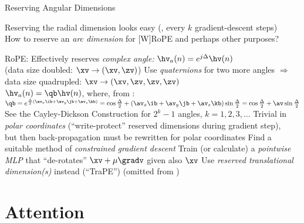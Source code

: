 \begin{slide}[\slideopts,toc={Reservations}]{Reserving Angular Dimensions}

  \vspace{-1em}

  Reserving the radial dimension looks easy (\eg,  every $k$ gradient-descent steps)\\
  How to reserve an \emph{arc dimension} for [W]RoPE and perhaps other purposes?

  \begin{itemize}
      \mpitem RoPE: Effectively reserves \emph{complex angle:} $\hv_a(n) = e^{j\Delta}\hv(n)$\\
      		    (data size doubled: $\xv \to (\xv,\zv)$)
      \mpitem Use \emph{quaternions} for two more angles $\Rightarrow$ data size quadrupled: $\xv \to (\xv,\zv,\zv,\zv)$\\
      $\hv_a(n) = \qb\hv(n)$, where, from :\\
      $
      \qb = e^{{\frac {\Delta}{2}}{(\av_x\ib +\av_y\jb +\av_z\kb )}}
      = \cos {\frac {\Delta }{2}}+(\av_x\ib +\av_y\jb + \av_z\kb )\sin {\frac {\Delta }{2}}
      = \cos {\frac {\Delta }{2}}+\av\sin {\frac {\Delta }{2}}
      $
      \mpitem See the Cayley-Dickson Construction for $2^k-1$ angles, $k=1,2,3,\ldots$
      \mpitem Trivial in \emph{polar coordinates} (``write-protect'' reserved dimensions during gradient step),\\
      but then back-propagation must be rewritten for polar coordinates
      \mpitem Find a suitable method of \emph{constrained gradient descent}
      \mpitem Train (or calculate) a \emph{pointwise MLP} that ``de-rotates'' $\xv+\mu\gradv$ given also $\xv$
      \mpitem Use \emph{reserved translational dimension(s)} instead (``TraPE'') (omitted from )
  \end{itemize}

\end{slide}

\section[\sectopts,toc={Attention}]{Attention}

